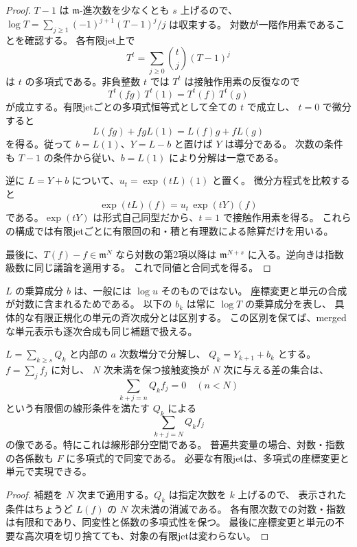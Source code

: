 \begin{proof}
$T-1$ は $\mathfrak m$-進次数を少なくとも $s$ 上げるので、
$\log T=\sum_{j\ge1}(-1)^{j+1}(T-1)^j/j$ は収束する。
対数が一階作用素であることを確認する。
各有限jet上で
\[
 T^t=\sum_{j\ge0}\binom tj(T-1)^j
\]
は $t$ の多項式である。非負整数 $t$ では $T^t$ は接触作用素の反復なので
\[
 T^t(fg)\,T^t(1)=T^t(f)\,T^t(g)
\]
が成立する。有限jetごとの多項式恒等式として全ての $t$ で成立し、
$t=0$ で微分すると
\[
 L(fg)+fgL(1)=L(f)g+fL(g)
\]
を得る。従って $b=L(1)$、$Y=L-b$ と置けば $Y$ は導分である。
次数の条件も $T-1$ の条件から従い、$b=L(1)$ により分解は一意である。

逆に $L=Y+b$ について、$u_t=\exp(tL)(1)$ と置く。
微分方程式を比較すると
\[
 \exp(tL)(f)=u_t\,\exp(tY)(f)
\]
である。$\exp(tY)$ は形式自己同型だから、$t=1$ で接触作用素を得る。
これらの構成では有限jetごとに有限回の和・積と有理数による除算だけを用いる。

最後に、$T(f)-f\in\mathfrak m^N$ なら対数の第2項以降は
$\mathfrak m^{N+s}$ に入る。逆向きは指数級数に同じ議論を適用する。
これで同値と合同式を得る。
\end{proof}

\begin{remark}[単元とその対数の規約]
$L$ の乗算成分 $b$ は、一般には $\log u$ そのものではない。
座標変更と単元の合成が対数に含まれるためである。
以下の $b_k$ は常に $\log T$ の乗算成分を表し、
具体的な有限正規化の単元の斉次成分とは区別する。
この区別を保てば、mergedな単元表示も逐次合成も同じ補題で扱える。
\end{remark}

\begin{corollary}[次のjetの有効作用は線形条件の核からの像である]
\label{cor:v14-filtered-contact-linearization}
$L=\sum_{k\ge s}Q_k$ と内部の $a$ 次数増分で分解し、
$Q_k=Y_{k+1}+b_k$ とする。$f=\sum_j f_j$ に対し、
$N$ 次未満を保つ接触変換が $N$ 次に与える差の集合は、
\[
 \sum_{k+j=n}Q_kf_j=0\quad(n<N)
\]
という有限個の線形条件を満たす $Q_k$ による
\[
 \sum_{k+j=N}Q_kf_j
\]
の像である。特にこれは線形部分空間である。
普遍共変量の場合、対数・指数の各係数も $F$ に多項式的で同変である。
必要な有限jetは、多項式の座標変更と単元で実現できる。
\end{corollary}

\begin{proof}
補題を $N$ 次まで適用する。$Q_k$ は指定次数を $k$ 上げるので、
表示された条件はちょうど $L(f)$ の $N$ 次未満の消滅である。
各有限次数での対数・指数は有限和であり、同変性と係数の多項式性を保つ。
最後に座標変更と単元の不要な高次項を切り捨てても、対象の有限jetは変わらない。
\end{proof}

